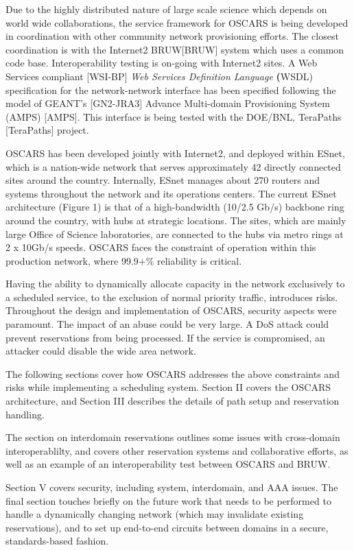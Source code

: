 \documentclass[conference]{IEEEtran}
\begin{document}
Due to the highly distributed nature of large scale science which depends
on world wide collaborations, the service framework for OSCARS is being
developed in  coordination with other community network provisioning efforts. 
The closest coordination is with the Internet2 BRUW[BRUW] system which 
uses a common code base. Interoperability testing is on-going with Internet2 sites. 
A Web Services compliant [WSI-BP]\emph{ Web Services Definition Language}
 \textbf({WSDL}) specification for the network-network 
interface has been specified following the model of GEANT's [GN2-JRA3] 
Advance Multi-domain Provisioning System (AMPS) [AMPS]. This interface is being 
tested with the DOE/BNL, TeraPaths [TeraPaths] project. 
 
OSCARS has been developed jointly with Internet2, and deployed within ESnet,
which is a nation-wide network that serves approximately 42 directly connected 
sites around the country.  Internally, ESnet manages about 270 routers and 
systems throughout the network and its operations centers.  The current ESnet 
architecture (Figure 1) is that of a high-bandwidth (10/2.5 Gb/s) backbone ring 
around the country, with hubs at strategic locations.  The sites, which are mainly
large Office of Science laboratories, are connected to the hubs via metro rings at 2 x 10Gb/s speeds.
OSCARS faces the constraint of operation within this production 
network, where 99.9+\% reliability is critical.

Having the ability to dynamically allocate capacity in the network exclusively 
to a scheduled service, to the exclusion of normal priority traffic, introduces 
risks.
Throughout the design and implementation of OSCARS, security aspects were
paramount.  The impact of an abuse could be very
large.  A DoS attack could prevent reservations from being processed.  If the
service is compromised, an attacker could disable the wide area network.

The following sections cover how OSCARS addresses the above constraints and
risks while implementing a scheduling system.  Section II covers the 
OSCARS architecture, and Section III describes the details of
path setup and reservation handling.

The section on interdomain reservations outlines some issues with cross-domain
 interoperablilty, and covers other reservation systems and 
collaborative efforts, as well as 
an example of an interoperability test between OSCARS and BRUW.

Section V covers security, including system, interdomain, and AAA issues.
The final section touches briefly on the future work that needs to be performed
to handle a dynamically changing network (which may invalidate existing
reservations), and to set up end-to-end circuits between domains
in a secure, standards-based fashion.
\end{document}
